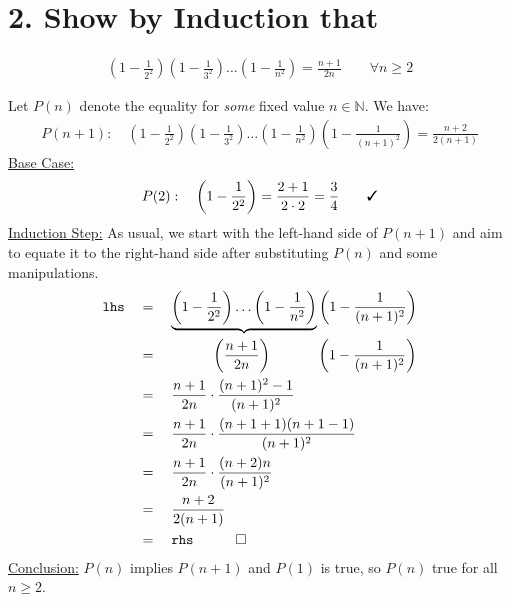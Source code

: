 \documentclass[12pt]{article}
\begin{document}
\section*{2. Show by Induction that}
\begin{question}
  \begin{align*}
  \left(1-\frac{1}{2^{2}}\right) \left(1-\frac{1}{3^{2}}\right) \ldots \left(1-\frac{1}{n^{2}}\right) 
  = \frac{n+1}{2n} \qquad \forall n\geq 2
  \end{align*}
\end{question}
Let $P(n)$ denote	the equality for \textit{some} fixed value $n\in\mathbb{N}$. We have:
\begin{align*}
P(n+1): \quad
\left(1-\frac{1}{2^{2}}\right) \left(1-\frac{1}{3^{2}}\right) \ldots \left(1-\frac{1}{n^{2}}\right) \left(1-\frac{1}{(n+1)^{2}}\right) = \frac{n+2}{2(n+1)}
\end{align*}
\underline{Base Case:}
\begin{align*}
P(2): \quad
  \left(1-\frac{1}{2^{2}}\right) = \frac{2+1}{2\cdot2} = \frac{3}{4} \qquad \cmark
\end{align*}
\underline{Induction Step:}
As usual, we start with the left-hand side of $P(n+1)$ and aim to equate it to the right-hand side after substituting $P(n)$ and some manipulations. 
\begin{align*}
\texttt{lhs} \quad
  & = \quad \underbrace{\left(1-\frac{1}{2^{2}}\right) \ldots \left(1-\frac{1}{n^{2}}\right)} \left(1-\frac{1}{(n+1)^{2}}\right)\\
  & = \quad \hspace{3em}\left(\frac{n+1}{2n}\right)\hspace{3.3em} \left(1-\frac{1}{(n+1)^{2}}\right)\\
  & = \quad \frac{n+1}{2n} \cdot \frac{(n+1)^{2}-1}{(n+1)^{2}} \\
  & = \quad \frac{n+1}{2n} \cdot \frac{(n+1+1)(n+1-1)}{(n+1)^{2}} \\
  & = \quad \frac{n+1}{2n} \cdot \frac{(n+2)n}{(n+1)^{2}} \\
  & = \quad \frac{n+2}{2(n+1)} \\
  & = \quad \texttt{rhs} \quad \qed 
\end{align*}
\underline{Conclusion:} $P(n)$ implies $P(n+1)$ and $P(1)$ is true, so $P(n)$ true for all $n\geq2$.
\end{document}
